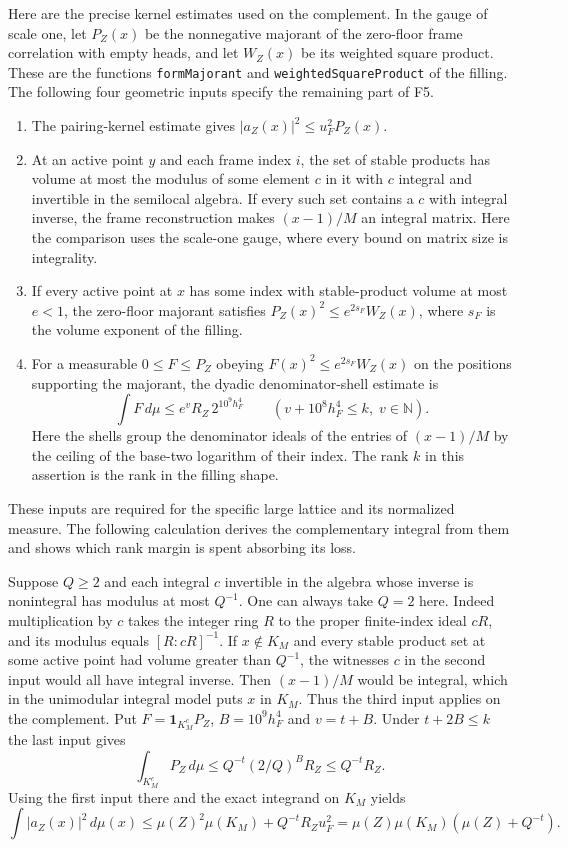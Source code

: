 Here are the precise kernel estimates used on the complement.
In the gauge of scale one, let $P_Z(x)$ be the nonnegative majorant
of the zero-floor frame correlation with empty heads, and let $W_Z(x)$
be its weighted square product. These are the functions
\texttt{formMajorant} and \texttt{weightedSquareProduct} of the filling.
The following four geometric inputs specify the remaining part of F5.
\begin{enumerate}
\item The pairing-kernel estimate gives $|a_Z(x)|^2\le u_F^2 P_Z(x)$.
\item At an active point $y$ and each frame index $i$, the set of stable
products has volume at most the modulus of some element $c$ in it with
$c$ integral and invertible in the semilocal algebra. If every such set
contains a $c$ with integral inverse, the frame reconstruction makes
$(x-1)/M$ an integral matrix. Here the comparison uses the scale-one gauge,
where every bound on matrix size is integrality.
\item If every active point at $x$ has some index with stable-product
volume at most $e<1$, the zero-floor majorant satisfies
$P_Z(x)^2\le e^{2s_F}W_Z(x)$, where $s_F$ is the volume exponent of
the filling.
\item For a measurable $0\le F\le P_Z$ obeying
$F(x)^2\le e^{2s_F}W_Z(x)$ on the positions supporting the majorant,
the dyadic denominator-shell estimate is
\[
 \int F\,d\mu\le e^v R_Z\,2^{10^9h_F^4}
       \qquad(v+10^8h_F^4\le k,\;v\in\mathbb N).
\]
Here the shells group the denominator ideals of the entries of $(x-1)/M$
by the ceiling of the base-two logarithm of their index. The rank $k$
in this assertion is the rank in the filling shape.
\end{enumerate}
These inputs are required for the specific large lattice and its normalized
measure. The following calculation derives the complementary integral from
them and shows which rank margin is spent absorbing its loss.

Suppose $Q\ge2$ and each integral $c$ invertible in the algebra
whose inverse is nonintegral has modulus at most $Q^{-1}$. One can
always take $Q=2$ here. Indeed multiplication by $c$ takes the
integer ring $R$ to the proper finite-index ideal $cR$, and
its modulus equals $[R:cR]^{-1}$. If $x\notin K_M$ and every stable
product set at some active point had volume greater than $Q^{-1}$,
the witnesses $c$ in the second input would all have integral inverse.
Then $(x-1)/M$ would be integral, which in the unimodular integral
model puts $x$ in $K_M$. Thus the third input applies on the complement.
Put $F=\mathbf1_{K_M^c}P_Z$, $B=10^9h_F^4$ and $v=t+B$.
Under $t+2B\le k$ the last input gives
\[
 \int_{K_M^c}P_Z\,d\mu\le Q^{-t}(2/Q)^B R_Z\le Q^{-t}R_Z .
\]
Using the first input there and the exact integrand on $K_M$ yields
\[
 \int |a_Z(x)|^2\,d\mu(x)
 \le\mu(Z)^2\mu(K_M)+Q^{-t}R_Zu_F^2
 =\mu(Z)\mu(K_M)(\mu(Z)+Q^{-t}).
\]

